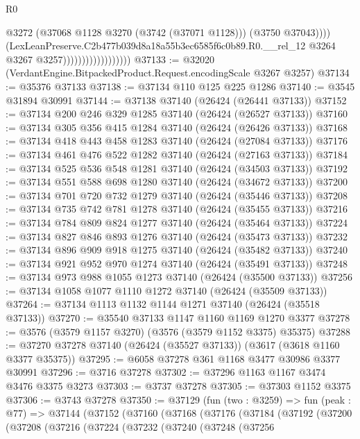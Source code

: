 \begin{lexlean}{R0}
\begin{coremodule}
                                            @3272
                                            (@37068 @1128 @3270 (@3742 (@37071 @1128)))
                                            (@3750 @37043))))
                                      (LexLeanPreserve.C2b477b039d8a18a55b3ec6585f6c0b89.R0.__rel_12
                                        @3264
                                        @3267
                                        @3257))))))))))))))))))
@37133 := @32020 (VerdantEngine.BitpackedProduct.Request.encodingScale @3267 @3257)
@37134 := @35376 @37133
@37138 := @37134 @110 @125 @225 @1286
@37140 := @3545 @31894 @30991
@37144 := @37138 @37140 (@26424 (@26441 @37133))
@37152 := @37134 @200 @246 @329 @1285 @37140 (@26424 (@26527 @37133))
@37160 := @37134 @305 @356 @415 @1284 @37140 (@26424 (@26426 @37133))
@37168 := @37134 @418 @443 @458 @1283 @37140 (@26424 (@27084 @37133))
@37176 := @37134 @461 @476 @522 @1282 @37140 (@26424 (@27163 @37133))
@37184 := @37134 @525 @536 @548 @1281 @37140 (@26424 (@34503 @37133))
@37192 := @37134 @551 @588 @698 @1280 @37140 (@26424 (@34672 @37133))
@37200 := @37134 @701 @720 @732 @1279 @37140 (@26424 (@35446 @37133))
@37208 := @37134 @735 @742 @781 @1278 @37140 (@26424 (@35455 @37133))
@37216 := @37134 @784 @809 @824 @1277 @37140 (@26424 (@35464 @37133))
@37224 := @37134 @827 @846 @893 @1276 @37140 (@26424 (@35473 @37133))
@37232 := @37134 @896 @909 @918 @1275 @37140 (@26424 (@35482 @37133))
@37240 := @37134 @921 @952 @970 @1274 @37140 (@26424 (@35491 @37133))
@37248 := @37134 @973 @988 @1055 @1273 @37140 (@26424 (@35500 @37133))
@37256 := @37134 @1058 @1077 @1110 @1272 @37140 (@26424 (@35509 @37133))
@37264 := @37134 @1113 @1132 @1144 @1271 @37140 (@26424 (@35518 @37133))
@37270 := @35540 @37133 @1147 @1160 @1169 @1270 @3377
@37278 := @3576 (@3579 @1157 @3270) (@3576 (@3579 @1152 @3375) @35375)
@37288 := @37270 @37278 @37140 (@26424 (@35527 @37133)) (@3617 (@3618 @1160 @3377 @35375))
@37295 := @6058 @37278 @361 @1168 @3477 @30986 @3377 @30991
@37296 := @3716 @37278
@37302 := @37296 @1163 @1167 @3474 @3476 @3375 @3273
@37303 := @3737 @37278
@37305 := @37303 @1152 @3375
@37306 := @3743 @37278
@37350 := @37129
    (fun (two : @3259) =>
    fun (peak : @77) =>
    @37144
      (@37152
        (@37160
          (@37168
            (@37176
              (@37184
                (@37192
                  (@37200
                    (@37208
                      (@37216
                        (@37224
                          (@37232
                            (@37240
                              (@37248
                                (@37256

\end{coremodule}
\end{lexlean}
